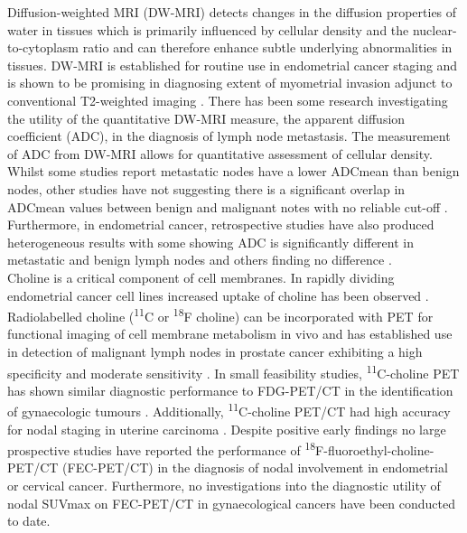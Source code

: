 \documentclass[sn-standardnature]{sn-jnl}
\theoremstyle{thmstyleone}%
\theoremstyle{thmstyletwo}%
\theoremstyle{thmstylethree}%
\begin{document}
Diffusion-weighted MRI (DW-MRI) detects changes in the diffusion properties of water in tissues which is primarily influenced by cellular density and the nuclear-to-cytoplasm ratio and can therefore enhance subtle underlying abnormalities in tissues. DW-MRI is established for routine use in endometrial cancer staging and is shown to be promising in diagnosing extent of myometrial invasion adjunct to conventional T2-weighted imaging 
\cite{rechichiMyometrialInvasionEndometrial2010,beddyEvaluationDepthMyometrial2012,koplayDiagnosticEfficacyDiffusionweighted2014}. 
There has been some research investigating the utility of the quantitative DW-MRI measure, the apparent diffusion coefficient (ADC), in the diagnosis of lymph node metastasis. The measurement of ADC from DW-MRI allows for quantitative assessment of cellular density. 
Whilst some studies report metastatic nodes have a lower ADCmean than benign nodes, other studies have not suggesting there is a significant overlap in ADCmean values between benign and malignant notes with no reliable cut-off  
\cite{nakaiDetectionEvaluationPelvic2008,royValueDiffusionweightedImaging2010,chenDiscriminationMetastaticHyperplastic2011}.
Furthermore, in endometrial cancer, retrospective studies have also produced heterogeneous results with some showing ADC is significantly different in metastatic and benign lymph nodes and others finding no difference
\cite{nakaiDetectionEvaluationPelvic2008,rechichiADCMapsPrediction2013}. \\

Choline is a critical component of cell membranes. In rapidly dividing endometrial cancer cell lines increased uptake of choline has been observed 
\cite{trousilAlterationsCholinePhospholipid2014}. 
Radiolabelled choline (\textsuperscript{11}C or \textsuperscript{18}F choline) can be incorporated with PET for functional imaging of cell membrane metabolism in vivo and has established use in detection of malignant lymph nodes in prostate cancer exhibiting a high specificity and moderate sensitivity 
\cite{contractorUse11CCholine2011}. 
In small feasibility studies, \textsuperscript{11}C-choline PET has shown similar diagnostic performance to FDG-PET/CT in the identification of gynaecologic tumours %
\cite{torizukaImagingGynecologicTumors2003}. 
Additionally, \textsuperscript{11}C-choline PET/CT had high accuracy for nodal staging in uterine carcinoma
\cite{sofueRoleCarbon11Choline2009}.
Despite positive early findings no large prospective studies have reported the performance of \textsuperscript{18}F-fluoroethyl-choline-PET/CT (FEC-PET/CT) in the diagnosis of nodal involvement in endometrial or cervical cancer. Furthermore, no investigations into the diagnostic utility of nodal SUVmax on FEC-PET/CT in gynaecological cancers have been conducted to date. \\
\end{document}
